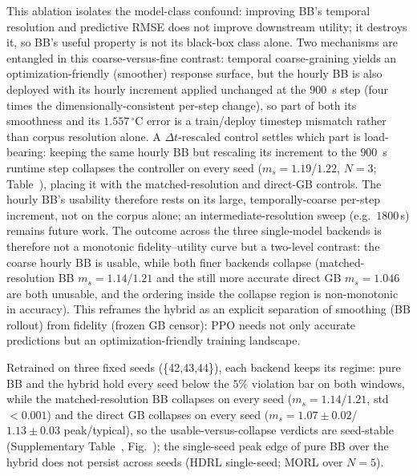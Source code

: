 This ablation isolates the model-class confound: improving BB's temporal resolution and predictive RMSE does not improve downstream utility; it destroys it, so BB's useful property is not its black-box class alone. Two mechanisms are entangled in this coarse-versus-fine contrast: temporal coarse-graining yields an optimization-friendly (smoother) response surface, but the hourly BB is also deployed with its hourly increment applied unchanged at the $900$~s step (four times the dimensionally-consistent per-step change), so part of both its smoothness and its $1.557\,^\circ$C error is a train/deploy timestep mismatch rather than corpus resolution alone. A $\Delta t$-rescaled control settles which part is load-bearing: keeping the same hourly BB but rescaling its increment to the $900$~s runtime step collapses the controller on every seed ($m_s=1.19$/$1.22$, $N=3$; Table~), placing it with the matched-resolution and direct-GB controls. The hourly BB's usability therefore rests on its large, temporally-coarse per-step increment, not on the corpus alone; an intermediate-resolution sweep (e.g.\ $1800$\,s) remains future work. The outcome across the three single-model backends is therefore not a monotonic fidelity--utility curve but a two-level contrast: the coarse hourly BB is usable, while both finer backends collapse (matched-resolution BB $m_s=1.14$/$1.21$ and the still more accurate direct GB $m_s=1.046$ are both unusable, and the ordering inside the collapse region is non-monotonic in accuracy). This reframes the hybrid as an explicit separation of smoothing (BB rollout) from fidelity (frozen GB censor): PPO needs not only accurate predictions but an optimization-friendly training landscape.

 Retrained on three fixed seeds (\{42,43,44\}), each backend keeps its regime: pure BB and the hybrid hold every seed below the $5\%$ violation bar on both windows, while the matched-resolution BB collapses on every seed ($m_s=1.14$/$1.21$, std $<0.001$) and the direct GB collapses on every seed ($m_s=1.07{\pm}0.02$/$1.13{\pm}0.03$ peak/typical), so the usable-versus-collapse verdicts are seed-stable (Supplementary Table~, Fig.~); the single-seed peak edge of pure BB over the hybrid does not persist across seeds (HDRL single-seed; MORL over $N{=}5$).





